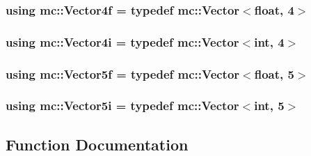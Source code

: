 \subsubsection[{\texorpdfstring{Vector4f}{Vector4f}}]{\setlength{\rightskip}{0pt plus 5cm}using {\bf mc\+::\+Vector4f} = typedef {\bf mc\+::\+Vector}$<$float, 4$>$}\hypertarget{namespacemc_a4707e2534bbb331543497a85a755bc1c}{}\label{namespacemc_a4707e2534bbb331543497a85a755bc1c}
\subsubsection[{\texorpdfstring{Vector4i}{Vector4i}}]{\setlength{\rightskip}{0pt plus 5cm}using {\bf mc\+::\+Vector4i} = typedef {\bf mc\+::\+Vector}$<${\bf int}, 4$>$}\hypertarget{namespacemc_a2886018be91992764bd5cf4e57f56cd8}{}\label{namespacemc_a2886018be91992764bd5cf4e57f56cd8}
\subsubsection[{\texorpdfstring{Vector5f}{Vector5f}}]{\setlength{\rightskip}{0pt plus 5cm}using {\bf mc\+::\+Vector5f} = typedef {\bf mc\+::\+Vector}$<$float, 5$>$}\hypertarget{namespacemc_adf31bc87669908e0eb5e5c10506f4d85}{}\label{namespacemc_adf31bc87669908e0eb5e5c10506f4d85}
\subsubsection[{\texorpdfstring{Vector5i}{Vector5i}}]{\setlength{\rightskip}{0pt plus 5cm}using {\bf mc\+::\+Vector5i} = typedef {\bf mc\+::\+Vector}$<${\bf int}, 5$>$}\hypertarget{namespacemc_a7ed5c5e05ed6579a2bd14ad0e00fc8d8}{}\label{namespacemc_a7ed5c5e05ed6579a2bd14ad0e00fc8d8}


\subsection{Function Documentation}

